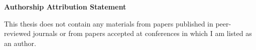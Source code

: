 \begin{titlepage}

\begin{center}
\Large{\bf{Authorship Attribution Statement}}
\end{center}

\vspace{0.2in}

\begin{spacing}{2}

This thesis does not contain any materials from papers published in peer-reviewed journals or from papers accepted at conferences in which I am listed as an author.

\end{spacing}

\vspace{2.5cm}

\begin{center}
	\makebox[4cm]{\dotfill}  \hfill \makebox[4cm]{\dotfill}\\
	      \hfill {}
\end{center}
\end{titlepage}
\newpage